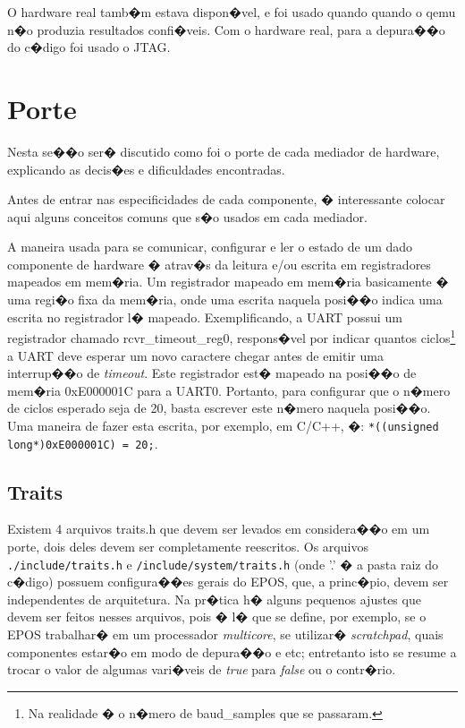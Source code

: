 \documentclass{ufscThesis/ufscThesis} %
\begin{document}
O hardware real tamb�m estava dispon�vel, e foi usado quando quando o qemu n�o produzia resultados confi�veis. Com o hardware real, para a depura��o do c�digo foi usado o JTAG.

\chapter{Porte}



Nesta se��o ser� discutido como foi o porte de cada mediador de hardware, explicando as decis�es e dificuldades encontradas.

Antes de entrar nas especificidades de cada componente, � interessante colocar aqui alguns conceitos comuns que s�o usados em cada mediador.

A maneira usada para se comunicar, configurar e ler o estado de um dado componente de hardware � atrav�s da leitura e/ou escrita em registradores mapeados em mem�ria. Um registrador mapeado em mem�ria basicamente � uma regi�o fixa da mem�ria, onde uma escrita naquela posi��o indica uma escrita no registrador l� mapeado.
Exemplificando, a UART possui um registrador chamado rcvr\_timeout\_reg0, respons�vel por indicar quantos ciclos\footnote{Na realidade � o n�mero de baud\_samples que se passaram.} a UART deve esperar um novo caractere chegar antes de emitir uma interrup��o de \emph{timeout}. Este registrador est� mapeado na posi��o de mem�ria 0xE000001C para a UART0. Portanto, para configurar que o n�mero de ciclos esperado seja de 20, basta escrever este n�mero naquela posi��o. Uma maneira de fazer esta escrita, por exemplo, em C/C++, �: \verb+*((unsigned long*)0xE000001C) = 20;+.



\section{Traits}

Existem 4 arquivos traits.h que devem ser levados em considera��o em um porte, dois deles devem ser completamente reescritos. Os arquivos \verb+./include/traits.h+ e \verb+/include/system/traits.h+ (onde '.' � a pasta raiz do c�digo) possuem configura��es gerais do EPOS, que, a princ�pio, devem ser independentes de arquitetura. Na pr�tica h� alguns pequenos ajustes que devem ser feitos nesses arquivos, pois � l� que se define, por exemplo, se o EPOS trabalhar� em um processador \emph{multicore}, se utilizar� \emph{scratchpad}, quais componentes estar�o em modo de depura��o e etc; entretanto isto se resume a trocar o valor de algumas vari�veis de \emph{true} para \emph{false} ou o contr�rio.
\end{document}
